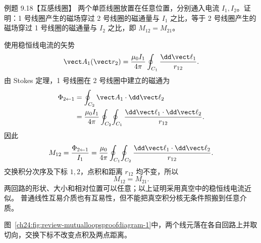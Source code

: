 \begin{origexamplebox}{例题 9.18【互感线圈】}
两个单匝线圈放置在任意位置，分别通入电流 $I_1,I_2$。证明：1 号线圈产生的磁场穿过 2 号线圈的磁通量与 $I_1$ 之比，等于 2 号线圈产生的磁场穿过 1 号线圈的磁通量与 $I_2$ 之比，即 $M_{12}=M_{21}$。
\begin{center}\end{center}
\label{fig:em24-question-18}

\end{origexamplebox}

\begin{xesolution}
\par\noindent\begin{minipage}{\linewidth}
\mutualLoopsProofDiagram
{}\label{ch24:fig:review-mutualloopsproofdiagram-1}
\end{minipage}\par\medskip

使用稳恒线电流的矢势
\begin{equation}
  \vect A_1(\vect r_2)=\frac{\mu_0I_1}{4\pi}
  \oint_{C_1}\frac{\dd\vect\ell_1}{r_{12}}.
\end{equation}
由 Stokes 定理，1 号线圈在 2 号线圈中建立的磁通为
\begin{align}
  \Phi_{2\leftarrow1}
  &=\oint_{C_2}\vect A_1\cdot\dd\vect\ell_2\\
  &=\frac{\mu_0I_1}{4\pi}\oint_{C_2}\!\oint_{C_1}
  \frac{\dd\vect\ell_1\cdot\dd\vect\ell_2}{r_{12}}.
\end{align}
因此
\begin{equation}
  M_{12}=\frac{\Phi_{2\leftarrow1}}{I_1}
  =\frac{\mu_0}{4\pi}\oint_{C_1}\!\oint_{C_2}
  \frac{\dd\vect\ell_1\cdot\dd\vect\ell_2}{r_{12}}.
\end{equation}
交换积分次序及下标 $1,2$，点积和距离 $r_{12}$ 均不变，所以
\begin{equation}
  \boxed{M_{12}=M_{21}}.
\end{equation}
两回路的形状、大小和相对位置可以任意；以上证明采用真空中的稳恒线电流近似。
普通线性互易介质也有互易性，但不能把真空积分核无条件照搬到任意介质。

图~\ref{ch24:fig:review-mutualloopsproofdiagram-1}中，两个线元落在各自回路上并取切向，交换下标不改变点积及两点距离。

\end{xesolution}

